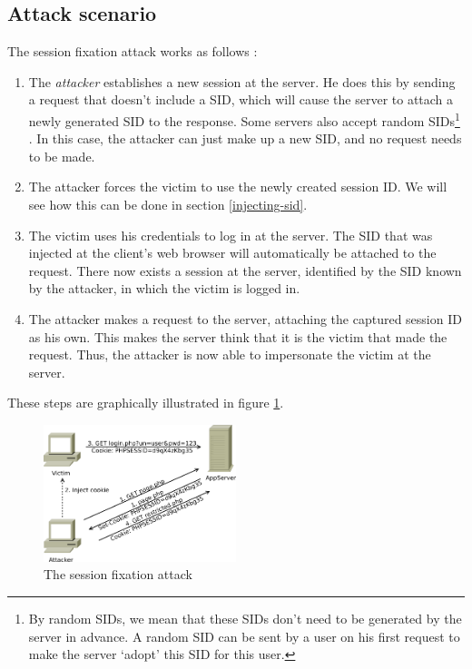 \subsection{Attack scenario}

The session fixation attack works as follows \cite{Kolsek2002}:

\begin{enumerate}
	\item The \emph{attacker} establishes a new session at the server. He does this by sending a request that doesn't include a SID, which will cause the server to attach a newly generated
SID to the response. Some servers also accept random SIDs\footnote{By random SIDs, we mean that these SIDs don't need to be generated by the server in advance. A random SID can be sent by a user on his first request to make the server `adopt' this SID for this user.} \cite{Shiflett2004}. In this case, the attacker can just make up a new SID, and no request needs to be made.
	\item The attacker forces the victim to use the newly created session ID. We will see how this can be done in section \ref{injecting-sid}.
	\item The victim uses his credentials to log in at the server. The SID that was injected at the client's web browser will automatically be attached to the request. There now exists a session at the server, identified by the SID known by the attacker, in which the victim is logged in.
	\item The attacker makes a request to the server, attaching the captured session ID as his own. This makes the server think that it is the victim that made the request. Thus, the attacker is now able to impersonate the victim at the server.
\end{enumerate}

These steps are graphically illustrated in figure \ref{fig:fixation}.

\begin{figure}[ht]
	\centering
	\includegraphics[width=0.50\textwidth]{img/fixation.png}
	\caption{The session fixation attack}
	\label{fig:fixation}
\end{figure}

